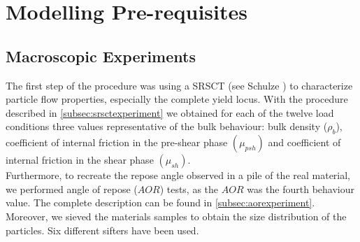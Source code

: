\section{Modelling Pre-requisites}
\label{sec:modellingprerequisites}

\subsection{Macroscopic Experiments}
\label{subsec:Macroscopicexperiments}

The first step of the procedure was using a SRSCT (see Schulze
\cite{RefWorks:142}) to characterize particle flow properties, especially the complete yield locus.
With the procedure described in \ref{subsec:srsctexperiment} we
obtained for each of the twelve load conditions three values representative of the bulk behaviour: bulk density ($\rho_b$),
coefficient of internal friction in the pre-shear phase $ (\mu_{psh})$ and
coefficient of internal friction in the shear phase  $ (\mu_{sh})$.\\
Furthermore, to recreate the repose angle observed in a pile of the real material, 
we performed angle of repose ($AOR$) tests, as the $AOR$ was the fourth
behaviour value. The complete description can be found in
\ref{subsec:aorexperiment}.
Moreover, we sieved the materials samples to obtain the size distribution of the
particles. Six different sifters have been used.\\

